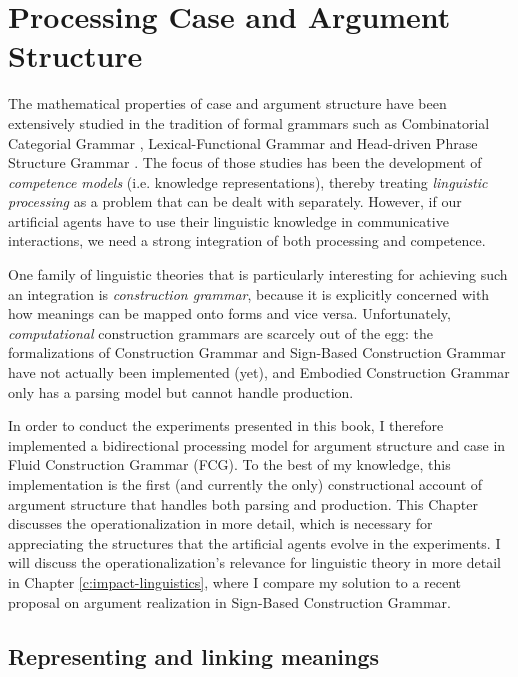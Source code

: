 
\setcounter{chapter}{1}
\chapter{Processing Case and Argument Structure}
\label{c:ar}

The mathematical properties of case and argument structure have been extensively studied in the tradition of formal grammars such as Combinatorial Categorial Grammar \citep[CCG;][]{steedman00syntactic}, Lexical-Functional Grammar \citep[LFG;][]{bresnan82mental} and Head-driven Phrase Structure Grammar \citep[HPSG;][]{sag94hpsg}. The focus of those studies has been the development of {\em competence models} (i.e. knowledge representations), thereby treating {\em linguistic processing} as a problem that can be dealt with separately. However, if our artificial agents have to use their linguistic knowledge in communicative interactions, we need a strong integration of both processing and competence.

One family of linguistic theories that is particularly interesting for achieving such an integration is {\em construction grammar}, because it is explicitly concerned with how meanings can be mapped onto forms and vice versa. Unfortunately, {\em computational} construction grammars are scarcely out of the egg: the formalizations of Construction Grammar \citep[CxG;][]{kay99grammatical} and Sign-Based Construction Grammar \citep[SBCG;][]{boas13sbcg} have not actually been implemented (yet), and Embodied Construction Grammar \citep[ECG,][]{bergen05embodied} only has a parsing model but cannot handle production.

In order to conduct the experiments presented in this book, I therefore implemented a bidirectional processing model for argument structure and case in Fluid Construction Grammar (FCG). To the best of my knowledge, this implementation is the first (and currently the only) constructional account of argument structure that handles both parsing and production. This Chapter discusses the operationalization in more detail, which is necessary for appreciating the structures that the artificial agents evolve in the experiments. I will discuss the operationalization's relevance for linguistic theory in more detail in Chapter \ref{c:impact-linguistics}, where I compare my solution to a recent proposal on argument realization in Sign-Based Construction Grammar. 

\section{Representing and linking meanings}
\label{s:linking}

